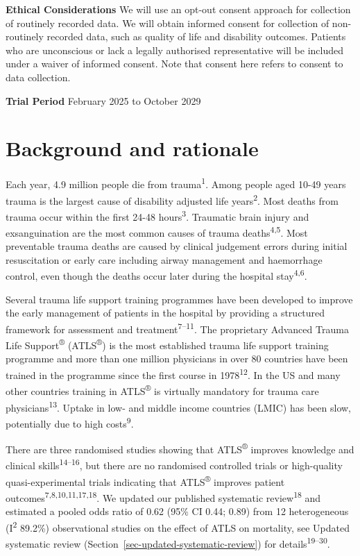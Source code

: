 \documentclass[
]{scrartcl}
\begin{document}
\textbf{Ethical Considerations} We will use an opt-out consent approach
for collection of routinely recorded data. We will obtain informed
consent for collection of non-routinely recorded data, such as quality
of life and disability outcomes. Patients who are unconscious or lack a
legally authorised representative will be included under a waiver of
informed consent. Note that consent here refers to consent to data
collection.

\textbf{Trial Period} February 2025 to October 2029

\newpage{}

\section{Background and rationale}\label{background-and-rationale}

Each year, 4.9 million people die from trauma\textsuperscript{1}. Among
people aged 10-49 years trauma is the largest cause of disability
adjusted life years\textsuperscript{2}. Most deaths from trauma occur
within the first 24-48 hours\textsuperscript{3}. Traumatic brain injury
and exsanguination are the most common causes of trauma
deaths\textsuperscript{4,5}. Most preventable trauma deaths are caused
by clinical judgement errors during initial resuscitation or early care
including airway management and haemorrhage control, even though the
deaths occur later during the hospital stay\textsuperscript{4,6}.

Several trauma life support training programmes have been developed to
improve the early management of patients in the hospital by providing a
structured framework for assessment and
treatment\textsuperscript{7--11}. The proprietary Advanced Trauma Life
Support\textsuperscript{®} (ATLS\textsuperscript{®}) is the most
established trauma life support training programme and more than one
million physicians in over 80 countries have been trained in the
programme since the first course in 1978\textsuperscript{12}. In the US
and many other countries training in ATLS\textsuperscript{®} is
virtually mandatory for trauma care physicians\textsuperscript{13}.
Uptake in low- and middle income countries (LMIC) has been slow,
potentially due to high costs\textsuperscript{9}.

There are three randomised studies showing that ATLS\textsuperscript{®}
improves knowledge and clinical skills\textsuperscript{14--16}, but
there are no randomised controlled trials or high-quality
quasi-experimental trials indicating that ATLS\textsuperscript{®}
improves patient outcomes\textsuperscript{7,8,10,11,17,18}. We updated
our published systematic review\textsuperscript{18} and estimated a
pooled odds ratio of 0.62 (95\% CI 0.44; 0.89) from 12 heterogeneous
(I\textsuperscript{2} 89.2\%) observational studies on the effect of
ATLS on mortality, see Updated systematic review
(Section~\ref{sec-updated-systematic-review}) for
details\textsuperscript{19--30}.
\end{document}
